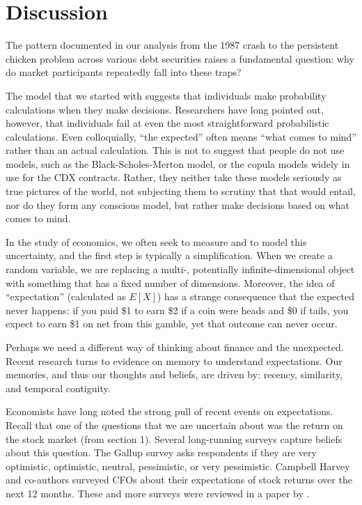 
\section{Discussion}
The pattern documented in our analysis \textemdash from the 1987 crash to the persistent chicken problem across various debt securities \textemdash raises a fundamental question: why do market participants repeatedly fall into these traps?

The model that we started with suggests that individuals make probability calculations when they make decisions. Researchers have long pointed out, however, that individuals fail at even the most straightforward probabilistic calculations. Even colloquially, “the expected” often means “what comes to mind” rather than an actual calculation. This is not to suggest that people do not use models, such as the Black-Scholes-Merton model, or the copula models widely in use for the CDX contracts. Rather, they neither take these models seriously as true pictures of the world, not subjecting them to scrutiny that that would entail, nor do they form any conscious model, but rather make decisions based on what comes to mind. 

In the study of economics, we often seek to measure and to model this uncertainty, and the first step is typically a simplification. When we create a random variable, we are replacing a multi-, potentially infinite-dimensional object with something that has a fixed number of dimensions. Moreover, the idea of “expectation” (calculated as $E[X]$) has a strange consequence that the expected never happens: if you paid \$1 to earn \$2 if a coin were heads and \$0 if tails, you expect to earn \$1 on net from this gamble, yet that outcome can never occur. 

Perhaps we need a different way of thinking about finance and the unexpected. Recent research turns to evidence on memory to understand expectations. Our memories, and thus our thoughts and beliefs, are driven by: recency, similarity, and temporal contiguity.


Economists have long noted the strong pull of recent events on expectations. Recall that one of the questions that we are uncertain about was the return on the stock market (from section 1). Several long-running surveys capture beliefs about this question. The Gallup survey asks respondents if they are very optimistic, optimistic, neutral, pessimistic, or very pessimistic. Campbell Harvey and co-authors surveyed CFOs about their expectations of stock returns over the next 12 months. These and more surveys were reviewed in a paper by \citet{greenwood2014expectations}.


